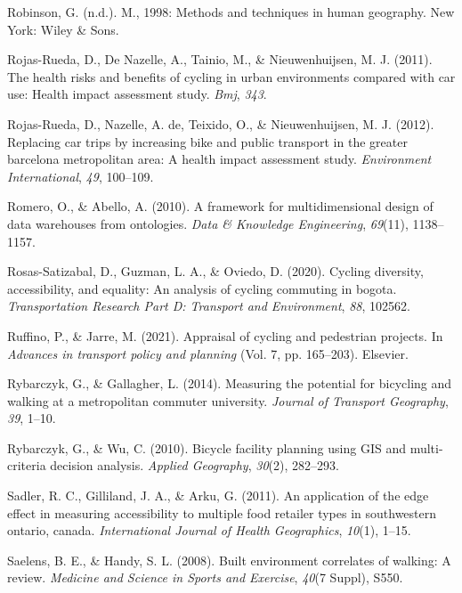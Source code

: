 \documentclass[
11pt, %
oneside, %
english, %
singlespacing, %
]{macthesis} %
\newlength{\cslhangindent}
\newenvironment{CSLReferences}[2] %
 {%
  \setlength{\parindent}{0pt}
  \ifodd #1 \everypar{\setlength{\hangindent}{\cslhangindent}}\ignorespaces\fi
  \ifnum #2 > 0
  \setlength{\parskip}{#2\baselineskip}
  \fi
 }%
 {}
\begin{document}
\begin{CSLReferences}{1}{0}
Robinson, G. (n.d.). M., 1998: Methods and techniques in human geography. New York: Wiley \& Sons.

Rojas-Rueda, D., De Nazelle, A., Tainio, M., \& Nieuwenhuijsen, M. J. (2011). The health risks and benefits of cycling in urban environments compared with car use: Health impact assessment study. \emph{Bmj}, \emph{343}.

Rojas-Rueda, D., Nazelle, A. de, Teixido, O., \& Nieuwenhuijsen, M. J. (2012). Replacing car trips by increasing bike and public transport in the greater barcelona metropolitan area: A health impact assessment study. \emph{Environment International}, \emph{49}, 100--109.

Romero, O., \& Abello, A. (2010). A framework for multidimensional design of data warehouses from ontologies. \emph{Data \& Knowledge Engineering}, \emph{69}(11), 1138--1157.

Rosas-Satizabal, D., Guzman, L. A., \& Oviedo, D. (2020). Cycling diversity, accessibility, and equality: An analysis of cycling commuting in bogota. \emph{Transportation Research Part D: Transport and Environment}, \emph{88}, 102562.

Ruffino, P., \& Jarre, M. (2021). Appraisal of cycling and pedestrian projects. In \emph{Advances in transport policy and planning} (Vol. 7, pp. 165--203). Elsevier.

Rybarczyk, G., \& Gallagher, L. (2014). Measuring the potential for bicycling and walking at a metropolitan commuter university. \emph{Journal of Transport Geography}, \emph{39}, 1--10.

Rybarczyk, G., \& Wu, C. (2010). Bicycle facility planning using GIS and multi-criteria decision analysis. \emph{Applied Geography}, \emph{30}(2), 282--293.

Sadler, R. C., Gilliland, J. A., \& Arku, G. (2011). An application of the edge effect in measuring accessibility to multiple food retailer types in southwestern ontario, canada. \emph{International Journal of Health Geographics}, \emph{10}(1), 1--15.

Saelens, B. E., \& Handy, S. L. (2008). Built environment correlates of walking: A review. \emph{Medicine and Science in Sports and Exercise}, \emph{40}(7 Suppl), S550.


\end{CSLReferences}
\end{document}
